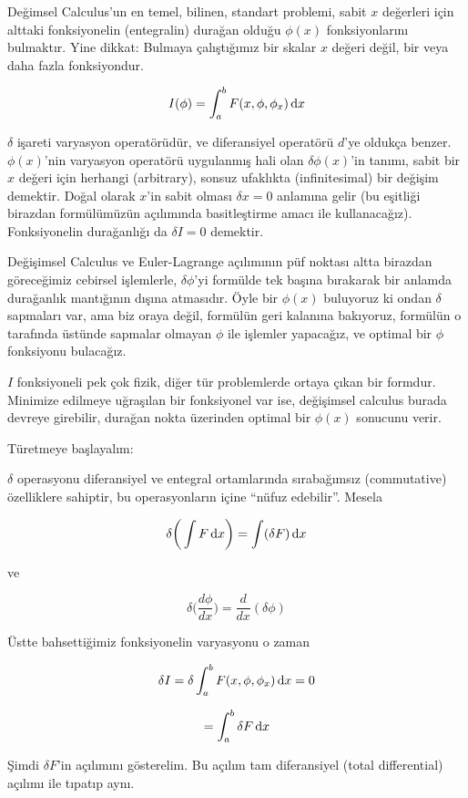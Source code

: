 \documentclass[12pt,fleqn]{article}\usepackage{../../common}
\begin{document}
Değimsel Calculus'un en temel, bilinen, standart problemi, sabit $x$
değerleri için alttaki fonksiyonelin (entegralin) durağan olduğu
$\phi(x)$ fonksiyonlarını bulmaktır. Yine dikkat: Bulmaya çalıştığımız
bir skalar $x$ değeri değil, bir veya daha fazla fonksiyondur.

$$ I(\phi)=\int_a^b F(x,\phi,\phi_x) \,\mathrm{d} x $$

$\delta$ işareti varyasyon operatörüdür, ve diferansiyel operatörü
$d$'ye oldukça benzer. $\phi(x)$'nin varyasyon operatörü uygulanmış
hali olan $\delta \phi(x)$'in tanımı, sabit bir $x$ değeri için
herhangi (arbitrary), sonsuz ufaklıkta (infinitesimal) bir değişim
demektir. Doğal olarak $x$'in sabit olması $\delta x = 0$ anlamına
gelir (bu eşitliği birazdan formülümüzün açılımında basitleştirme
amacı ile kullanacağız). Fonksiyonelin durağanlığı da $\delta I = 0$
demektir.

Değişimsel Calculus ve Euler-Lagrange açılımının püf noktası altta
birazdan göreceğimiz cebirsel işlemlerle, $\delta \phi$'yi formülde
tek başına bırakarak bir anlamda durağanlık mantığının dışına
atmasıdır. Öyle bir $\phi(x)$ buluyoruz ki ondan $\delta$ sapmaları
var, ama biz oraya değil, formülün geri kalanına bakıyoruz, formülün o
tarafında üstünde sapmalar olmayan $\phi$ ile işlemler yapacağız, ve
optimal bir $\phi$ fonksiyonu bulacağız.

$I$ fonksiyoneli pek çok fizik, diğer tür problemlerde ortaya çıkan
bir formdur. Minimize edilmeye uğraşılan bir fonksiyonel var ise,
değişimsel calculus burada devreye girebilir, durağan nokta üzerinden
optimal bir $\phi(x)$ sonucunu verir.

Türetmeye başlayalım:

$\delta$ operasyonu diferansiyel ve entegral ortamlarında sırabağımsız
(commutative) özelliklere sahiptir, bu operasyonların içine ``nüfuz
edebilir''.  Mesela

$$ \delta \bigg( \int F \,\mathrm{d} x \bigg) = \int (\delta F) \,\mathrm{d} x $$

ve

$$ \delta \bigg( \frac{d\phi}{dx} \bigg) = \frac{d}{dx}(\delta \phi) $$

Üstte bahsettiğimiz fonksiyonelin varyasyonu o zaman

$$ \delta I = \delta \int_a^b F(x,\phi,\phi_x)\,\mathrm{d} x = 0 $$

$$ = \int_a^b \delta F \,\mathrm{d} x  $$

Şimdi $\delta F$'in açılımını gösterelim. Bu açılım tam diferansiyel (total
differential) açılımı ile tıpatıp aynı. 
\end{document}
